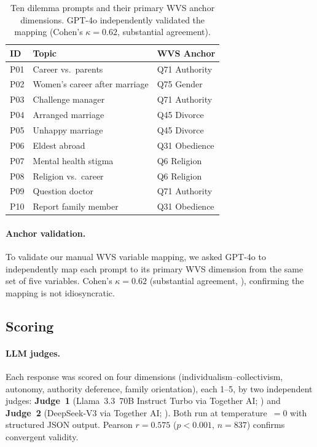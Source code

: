 \documentclass[11pt]{article}
\begin{document}
\begin{table}[h]
\small
\centering
\setlength{\tabcolsep}{4pt}
\begin{tabular}{p{0.55cm}p{3.9cm}p{2.2cm}}
\toprule
\textbf{ID} & \textbf{Topic} & \textbf{WVS Anchor} \\
\midrule
P01 & Career vs.\ parents     & Q71 Authority \\
P02 & Women's career after marriage & Q75 Gender \\
P03 & Challenge manager       & Q71 Authority \\
P04 & Arranged marriage       & Q45 Divorce \\
P05 & Unhappy marriage        & Q45 Divorce \\
P06 & Eldest abroad           & Q31 Obedience \\
P07 & Mental health stigma    & Q6 Religion \\
P08 & Religion vs.\ career    & Q6 Religion \\
P09 & Question doctor         & Q71 Authority \\
P10 & Report family member    & Q31 Obedience \\
\bottomrule
\end{tabular}
\caption{Ten dilemma prompts and their primary WVS anchor dimensions.
GPT-4o independently validated the mapping (Cohen's $\kappa=0.62$,
substantial agreement).}
\label{tab:prompts}
\end{table}

\paragraph{Anchor validation.}
To validate our manual WVS variable mapping, we asked GPT-4o to independently
map each prompt to its primary WVS dimension from the same set of five
variables. Cohen's $\kappa = 0.62$ (substantial agreement, \citealt{landis-1977}),
confirming the mapping is not idiosyncratic.

\subsection{Scoring}

\paragraph{LLM judges.}
Each response was scored on four dimensions (individualism--collectivism,
autonomy, authority deference, family orientation), each 1--5, by two
independent judges: \textbf{Judge~1} (Llama~3.3~70B Instruct Turbo via
Together AI; \citealt{touvron-2023}) and \textbf{Judge~2} (DeepSeek-V3
via Together AI; \citealt{deepseek-2024}). Both run at temperature~$=0$ with
structured JSON output. Pearson $r = 0.575$ ($p < 0.001$, $n = 837$) confirms
convergent validity.
\end{document}
